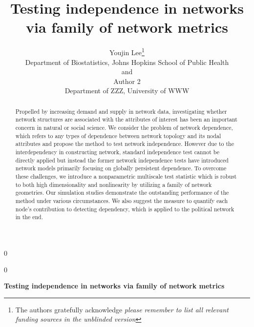 \documentclass[12pt]{article}
\newcommand{\blind}{0}
\theoremstyle{definition}
\begin{document}
	
	
	\def\spacingset#1{\renewcommand{\baselinestretch}%
		{#1}\small\normalsize} \spacingset{1}
	
	
	
	\blind
	{
		\title{\bf Testing independence in networks via family of network metrics}
		\author{Youjin Lee\thanks{
				The authors gratefully acknowledge \textit{please remember to list all relevant funding sources in the unblinded version}}\hspace{.2cm}\\
			Department of Biostatistics, Johns Hopkins School of Public Health\\
			and \\
			Author 2 \\
			Department of ZZZ, University of WWW}
		\maketitle
	} \fi
	
	\blind
	{
		\bigskip
		\bigskip
		\bigskip
		\begin{center}
			{\LARGE\bf Testing independence in networks via family of network metrics}
		\end{center}
		\medskip
	} \fi
	
	
\sloppy
\bigskip
\begin{abstract}
Propelled by increasing demand and supply in network data, investigating whether network structures are associated with the attributes of interest has been an important concern in natural or social science. We consider the problem of network dependence, which refers to any types of dependence between network topology and its nodal attributes and propose the method to test network independence. However due to the interdependency in constructing network, standard independence test cannot be directly applied but instead the former network independence tests have introduced network models primarily focusing on globally persistent dependence. To overcome these challenges, we introduce a nonparametric multiscale test statistic which is robust to both high dimensionality and nonlinearity by utilizing a family of network geometries. Our simulation studies demonstrate the outstanding performance of the method under various circumstances. We also suggest the measure to quantify each node's contribution to detecting dependency, which is applied to the political network in the end.
\end{abstract}
	
\end{document}
